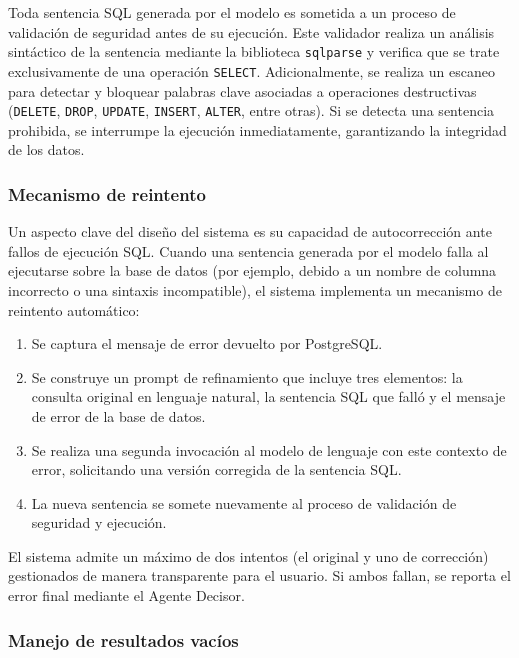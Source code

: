 Toda sentencia SQL generada por el modelo es sometida a un proceso de
validación de seguridad antes de su ejecución. Este validador realiza un
análisis sintáctico de la sentencia mediante la biblioteca \texttt{sqlparse} y
verifica que se trate exclusivamente de una operación \texttt{SELECT}.
Adicionalmente, se realiza un escaneo para detectar y bloquear
palabras clave asociadas a operaciones destructivas (\texttt{DELETE},
\texttt{DROP}, \texttt{UPDATE}, \texttt{INSERT}, \texttt{ALTER}, entre otras).
Si se detecta una sentencia prohibida, se interrumpe la ejecución
inmediatamente, garantizando la integridad de los datos.

\subsubsection{Mecanismo de reintento}

Un aspecto clave del diseño del sistema es su capacidad de autocorrección ante
fallos de ejecución SQL. Cuando una sentencia generada por el modelo falla al
ejecutarse sobre la base de datos (por ejemplo, debido a un nombre de columna
incorrecto o una sintaxis incompatible), el sistema implementa un mecanismo de
reintento automático:

\begin{enumerate}
      \item Se captura el mensaje de error devuelto por PostgreSQL.
      \item Se construye un prompt de refinamiento que incluye tres elementos: la
            consulta original en lenguaje natural, la sentencia SQL que falló y el mensaje
            de error de la base de datos.
      \item Se realiza una segunda invocación al modelo de lenguaje con este
            contexto de error, solicitando una versión corregida de la sentencia SQL.
      \item La nueva sentencia se somete nuevamente al proceso de validación de
            seguridad y ejecución.
\end{enumerate}

El sistema admite un máximo de dos intentos (el original y uno de
corrección) gestionados de manera transparente para el usuario. Si ambos
fallan, se reporta el error final mediante el Agente Decisor.

\subsubsection{Manejo de resultados vacíos}

